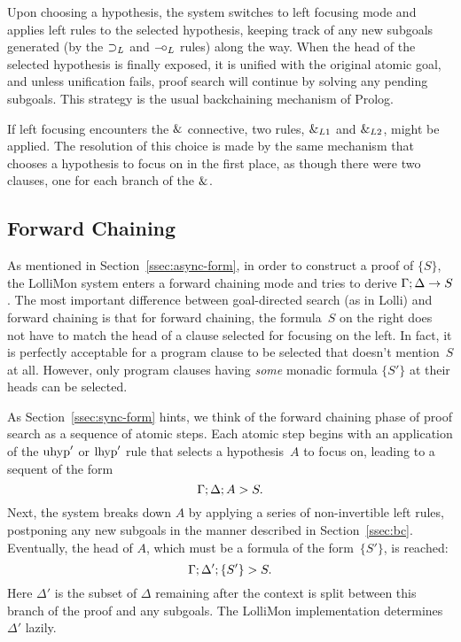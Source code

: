 \documentclass{sig-alt}
\begin{document}
Upon choosing a hypothesis, the system switches to left
focusing mode and applies left rules to the selected
hypothesis, keeping track of any new subgoals generated (by the
$\supset_L$ and $\mathbin{-\hspace{-0.70mm}\circ}_L$ rules) along the way.  When the head of the
selected hypothesis is finally exposed, it is unified with the
original atomic goal, and unless unification fails, proof search will
continue by solving any pending subgoals.  This strategy is the usual
backchaining mechanism of Prolog.

If left focusing encounters the $\mathbin{\&}$ connective, 
two rules, $\mathbin{\&}_{L1}$ and $\mathbin{\&}_{L2}$, might be applied.
The resolution of this choice is made
by the same mechanism that chooses a hypothesis to focus on in the
first place, as though there were two clauses, one for each branch
of the $\mathbin{\&}$.

\subsection{Forward Chaining}
\label{ssec:forward}
As mentioned in Section~\ref{ssec:async-form}, in order to construct
a proof of $\{S\}$, the LolliMon system enters a forward chaining
mode and tries to derive $\Gamma;\Delta\rightarrow S$.
The most important difference
between goal-directed search (as in Lolli) and forward chaining is
that for forward chaining, the formula~$S$ on the right does not have
to match the head of a clause selected for focusing on the left.  In
fact, it is perfectly acceptable for a program clause to be selected
that doesn't mention~$S$ at all.  However, only program clauses having
\emph{some} monadic formula $\{S'\}$ at their heads can be selected.

As Section~\ref{ssec:sync-form} hints, we think of the forward
chaining phase of proof search as a sequence of atomic steps.  Each
atomic step begins with an application of the $\hbox{uhyp}'$ or
$\hbox{lhyp}'$ rule that selects a hypothesis~$A$ to focus on, leading to
a sequent of the form
$$
  \Gamma;\Delta;A\mathrel>S.
$$
%
Next, the system breaks down $A$ by applying a series of non-invertible
left rules, postponing any new subgoals in the manner described in
Section~\ref{ssec:bc}.  Eventually, the head of $A$, which
must be a formula of the form~$\{S'\}$, is reached:
$$
\Gamma;\Delta';\{S'\}\mathrel>S.
$$
%
Here $\Delta'$ is the subset of $\Delta$ remaining after the
context is split between this branch of the proof and any subgoals.
The LolliMon implementation determines $\Delta'$ lazily.
\end{document}
